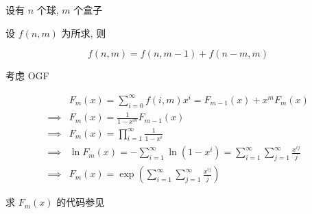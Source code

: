 设有 \(n\) 个球, \(m\) 个盒子

设 \(f(n,m)\) 为所求, 则

\[
    f(n,m)=f(n,m-1)+f(n-m,m)
\]

考虑 OGF

\[
    \begin{aligned}
                 & F_m(x) =\sum_{i=0}^{\infty}f(i,m)x^i =F_{m-1}(x)+x^m F_m(x)                                        \\
        \implies & F_m(x)=\frac{1}{1-x^m}F_{m-1}(x)                                                                   \\
        \implies & F_m(x)=\prod_{i=1}^{\infty}\frac{1}{1-x^i}                                                         \\
        \implies & \ln F_m(x)=-\sum_{i=1}^{\infty}\ln(1-x^i) =\sum_{i=1}^{\infty}\sum_{j=1}^{\infty} \frac{x^{ij}}{j} \\
        \implies & F_m(x)=\exp\left(\sum_{i=1}^{\infty}\sum_{j=1}^{\infty} \frac{x^{ij}}{j}\right)
    \end{aligned}
\]

求 \(F_m(x)\) 的代码参见 
